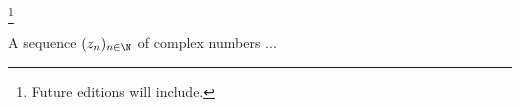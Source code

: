 
\footnote{Future editions will include.}


A sequence $(z_n)_{n \in  \N}$ of complex numbers ...

\blankpage
